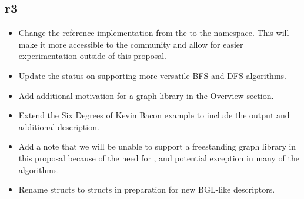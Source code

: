 \subsection*{\paperno r3}
\begin{itemize}
      \item Change the reference implementation from the  to the  namespace. This will
            make it more accessible to the community and allow for easier experimentation outside of this proposal.
      \item Update the status on supporting more versatile BFS and DFS algorithms.
      \item Add additional motivation for a graph library in the Overview section.
      \item Extend the Six Degrees of Kevin Bacon example to include the output and additional description.
      \item Add a note that we will be unable to support a freestanding graph library in this proposal because
            of the need for ,  and potential  exception in many of 
            the algorithms.
      \item Rename  structs to  structs in preparation for new BGL-like descriptors.
\end{itemize}
